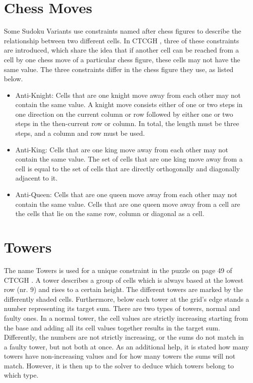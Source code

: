 \section{Chess Moves}
Some Sudoku Variants use constraints named after chess figures to describe the relationship between two different cells. In CTCGH \cite{CrackingTheCryptic2021}, three of these constraints are introduced, which share the idea that if another cell can be reached from a cell by one chess move of a particular chess figure, these cells may not have the same value. The three constraints differ in the chess figure they use, as listed below.
\begin{itemize}
    \item Anti-Knight: Cells that are one knight move away from each other may not contain the same value. A knight move consists either of one or two steps in one direction on the current column or row followed by either one or two steps in the then-current row or column. In total, the length must be three steps, and a column and row must be used.
    \item Anti-King: Cells that are one king move away from each other may not contain the same value. The set of cells that are one king move away from a cell is equal to the set of cells that are directly orthogonally and diagonally adjacent to it.
    \item Anti-Queen: Cells that are one queen move away from each other may not contain the same value. Cells that are one queen move away from a cell are the cells that lie on the same row, column or diagonal as a cell.
\end{itemize}

\section{Towers}
The name Towers is used for a unique constraint in the puzzle on page 49 of CTCGH \cite{CrackingTheCryptic2021}. A tower describes a group of cells which is always based at the lowest row (nr. 9) and rises to a certain height. The different towers are marked by the differently shaded cells. Furthermore, below each tower at the grid's edge stands a number representing its target sum. There are two types of towers, normal and faulty ones. In a normal tower, the cell values are strictly increasing starting from the base and adding all its cell values together results in the target sum. Differently, the numbers are not strictly increasing, or the sums do not match in a faulty tower, but not both at once. As an additional help, it is stated how many towers have non-increasing values and for how many towers the sums will not match. However, it is then up to the solver to deduce which towers belong to which type.

